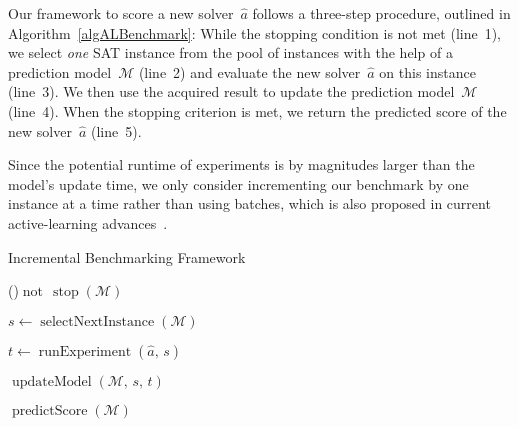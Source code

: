 \documentclass[runningheads]{llncs}
\begin{document}
Our framework to score a new solver~$\hat{a}$ follows a three-step procedure, outlined in Algorithm~\ref{algALBenchmark}:
While the stopping condition is not met (line~1), we select \emph{one} SAT instance from the pool of instances with the help of a prediction model~$\mathcal{M}$ (line~2) and evaluate the new solver~$\hat{a}$ on this instance (line~3).
We then use the acquired result to update the prediction model~$\mathcal{M}$ (line~4).
When the stopping criterion is met, we return the predicted score of the new solver~$\hat{a}$ (line~5).

Since the potential runtime of experiments is by magnitudes larger than the model's update time, we only consider incrementing our benchmark by one instance at a time rather than using batches, which is also proposed in current active-learning advances~\cite{SinhaED19,2019gaal}.

\begin{algorithm}
  \caption{Incremental Benchmarking Framework}
  \label{algALBenchmark}


  \BlankLine


  \While(){$\operatorname{not} \, \operatorname{stop}\!\left(\mathcal{M}\right)$}{
    $s \leftarrow \operatorname{selectNextInstance}\!\left(\mathcal{M}\right)$ 

    $t \leftarrow \operatorname{runExperiment}\!\left(\hat{a},\,  s\right)$  


    $\operatorname{updateModel}\!\left(\mathcal{M},\, s,\, t\right)$ 
  }
  
  \Return $\operatorname{predictScore}\!\left(\mathcal{M}\right)$ 

\end{algorithm}
\end{document}
